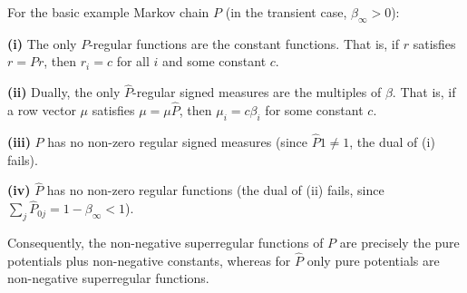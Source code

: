 For the basic example Markov chain $P$ (in the transient case, $\beta_\infty > 0$):

\textbf{(i)} The only $P$-regular functions are the constant functions. That is, if $r$ satisfies $r = Pr$, then $r_i = c$ for all $i$ and some constant $c$.

\textbf{(ii)} Dually, the only $\hat{P}$-regular signed measures are the multiples of $\beta$. That is, if a row vector $\mu$ satisfies $\mu = \mu \hat{P}$, then $\mu_i = c \beta_i$ for some constant $c$.

\textbf{(iii)} $P$ has no non-zero regular signed measures (since $\hat{P}1 \neq 1$, the dual of (i) fails).

\textbf{(iv)} $\hat{P}$ has no non-zero regular functions (the dual of (ii) fails, since $\sum_j \hat{P}_{0j} = 1 - \beta_\infty < 1$).

Consequently, the non-negative superregular functions of $P$ are precisely the pure potentials plus non-negative constants, whereas for $\hat{P}$ only pure potentials are non-negative superregular functions.

